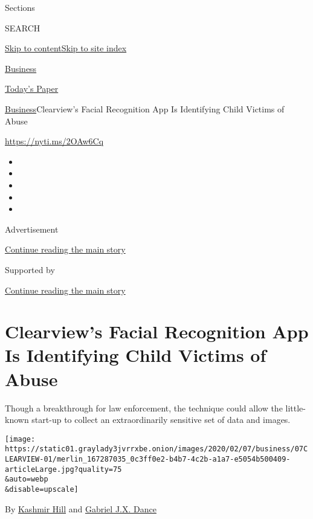 Sections

SEARCH

\protect\hyperlink{site-content}{Skip to
content}\protect\hyperlink{site-index}{Skip to site index}

\href{https://www.nytimes3xbfgragh.onion/section/business}{Business}

\href{https://myaccount.nytimes3xbfgragh.onion/auth/login?response_type=cookie\&client_id=vi}{}

\href{https://www.nytimes3xbfgragh.onion/section/todayspaper}{Today's
Paper}

\href{/section/business}{Business}\textbar{}Clearview's Facial
Recognition App Is Identifying Child Victims of Abuse

\url{https://nyti.ms/2OAw6Cq}

\begin{itemize}
\item
\item
\item
\item
\item
\end{itemize}

Advertisement

\protect\hyperlink{after-top}{Continue reading the main story}

Supported by

\protect\hyperlink{after-sponsor}{Continue reading the main story}

\hypertarget{clearviews-facial-recognition-app-is-identifying-child-victims-of-abuse}{%
\section{Clearview's Facial Recognition App Is Identifying Child Victims
of
Abuse}\label{clearviews-facial-recognition-app-is-identifying-child-victims-of-abuse}}

Though a breakthrough for law enforcement, the technique could allow the
little-known start-up to collect an extraordinarily sensitive set of
data and images.

\texttt{[image: https://static01.graylady3jvrrxbe.onion/images/2020/02/07/business/07CLEARVIEW-01/merlin\_167287035\_0c3ff0e2-b4b7-4c2b-a1a7-e5054b500409-articleLarge.jpg?quality=75\\\&auto=webp\\\&disable=upscale]}

By \href{https://www.nytimes3xbfgragh.onion/by/kashmir-hill}{Kashmir
Hill} and
\href{https://www.nytimes3xbfgragh.onion/by/gabriel-dance}{Gabriel J.X.
Dance}

